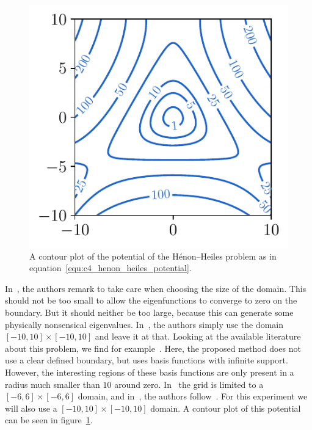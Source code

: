\begin{figure}
    \begin{minipage}[b]{.5\textwidth}
        \includegraphics[width=\textwidth]{img/chapter4/henon_contour.pdf}
    \end{minipage}
    \hfill
    \begin{minipage}[b]{.49\textwidth}
        \caption{A contour plot of the potential of the Hénon--Heiles problem as in equation~\eqref{equ:c4_henon_heiles_potential}.}
        \label{fig:c4_henon_contour}
    \end{minipage}
\end{figure}

In~\cite{wang_new_2009}, the authors remark to take care when choosing the size of the domain. This should not be too small to allow the eigenfunctions to converge to zero on the boundary. But it should neither be too large, because this can generate some physically nonsensical eigenvalues. In~\cite{wang_new_2009}, the authors simply use the domain $[-10, 10] \times [-10, 10]$ and leave it at that. Looking at the available literature about this problem, we find for example~\cite{davis_semiclassical_1979}. Here, the proposed method does not use a clear defined boundary, but uses basis functions with infinite support. However, the interesting regions of these basis functions are only present in a radius much smaller than $10$ around zero. In~\cite{braun_efficient_1996} the grid is limited to a $[-6, 6] \times [-6, 6]$ domain, and in~\cite{baeyens_improvements_2022}, the authors follow~\cite{braun_efficient_1996}. For this experiment we will also use a $[-10, 10] \times [-10, 10]$ domain. A contour plot of this potential can be seen in figure~\ref{fig:c4_henon_contour}.

